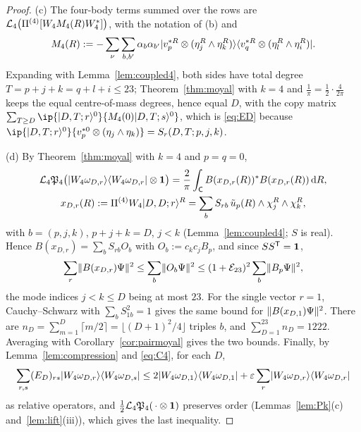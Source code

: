 \begin{proof}
(c) The four-body terms summed over the rows are $\mathcal{L}_4\bigl(\Pi^{(4)}[W_4M_4(R)W_4^*]\bigr)$, with the notation of (b) and
\[
M_4(R):=-\sum_\nu\sum_{b,b'}\alpha_b\alpha_{b'}\lvert v_p^{*R}\otimes(\eta_j^R\wedge\eta_k^R)\rangle\langle v_q^{*R}\otimes(\eta_l^R\wedge\eta_i^R)\rvert.
\]
Expanding
with Lemma~\ref{lem:coupled4}, both sides have total degree $T=p+j+k=q+l+i\le23$; Theorem~\ref{thm:moyal} with $k=4$ and
$\frac1\pi=\frac12\cdot\frac4{2\pi}$ keeps the equal centre-of-mass degrees, hence equal $D$, with the copy matrix
$\sum_{T\ge D}\ip{\ket{D,T;r}^0}{M_4(0)\ket{D,T;s}^0}$, which is \eqref{eq:ED} because
$\ip{\ket{D,T;r}^0}{v_p^{*0}\otimes(\eta_j\wedge\eta_k)}=S_r(D,T;p,j,k)$.

(d) By Theorem~\ref{thm:moyal} with $k=4$ and $p=q=0$,
\begin{gather*}
\mathcal{L}_4\mathfrak{P}_4\bigl(\lvert W_4\omega_{D,r}\rangle\langle W_4\omega_{D,r}\rvert\otimes\mathbf{1}\bigr)=\frac2\pi\int_{\mathsf{C}} B(x_{D,r}(R))^*B(x_{D,r}(R))\,\mathrm{d} R,\\
x_{D,r}(R):=\Pi^{(4)}W_4\lvert D,D;r\rangle^R=\sum_bS_{rb}\,\tilde u_p(R)\wedge\chi_j^R\wedge\chi_k^R,
\end{gather*}
with $b=(p,j,k)$, $p+j+k=D$, $j<k$ (Lemma~\ref{lem:coupled4}; $S$ is real). Hence $B(x_{D,r})=\sum_bS_{rb}O_b$ with
$O_b:=c_kc_jB_p$, and since $SS^{\mathsf T}=\mathbf{1}$,
\[
\sum_r\lVert B(x_{D,r})\Psi\rVert^2\le\sum_b\lVert O_b\Psi\rVert^2\le(1+\mathcal{E}_{23})^2\sum_b\lVert B_p\Psi\rVert^2,
\]
the mode indices $j<k\le D$ being at most $23$.
For the single vector $r=1$, Cauchy--Schwarz with $\sum_bS_{1b}^2=1$ gives the same bound for $\lVert B(x_{D,1})\Psi\rVert^2$. There are
$n_D=\sum_{m=1}^D\lceil m/2\rceil=\lfloor(D+1)^2/4\rfloor$ triples $b$, and $\sum_{D=1}^{23}n_D=1222$. Averaging with
Corollary~\ref{cor:pairmoyal} gives the two bounds. Finally, by Lemma~\ref{lem:compression} and \eqref{eq:C4}, for each $D$,
\[
\sum_{r,s}(E_D)_{rs}\lvert W_4\omega_{D,r}\rangle\langle W_4\omega_{D,s}\rvert\le2\lvert W_4\omega_{D,1}\rangle\langle W_4\omega_{D,1}\rvert+\varepsilon\sum_r\lvert W_4\omega_{D,r}\rangle\langle W_4\omega_{D,r}\rvert
\]
as relative operators, and $\frac12\mathcal{L}_4\mathfrak{P}_4(\,\cdot\otimes\mathbf{1})$ preserves order (Lemmas~\ref{lem:Pk}(c) and~\ref{lem:lift}(iii)), which gives the last inequality.
\end{proof}
